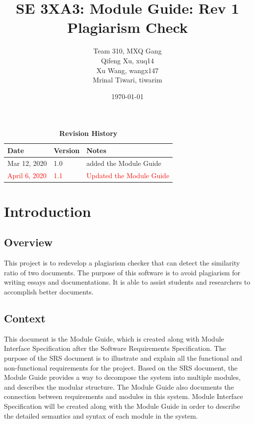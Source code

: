 \documentclass[12pt, titlepage]{article}
\title{SE 3XA3: Module Guide: Rev 1 \\Plagiarism Check}
\author{Team 310, MXQ Gang
		\\ Qifeng Xu, xuq14
		\\ Xu Wang, wangx147
		\\ Mrinal Tiwari, tiwarim
}
\date{\today}
\begin{document}
\maketitle

{
  \hypersetup{linkcolor=black}
  \tableofcontents
}
{
  \hypersetup{linkcolor=black}
  \listoftables
}

{
  \hypersetup{linkcolor=black}
  \listoffigures
}


\begin{table}[H]
\caption{\bf Revision History}
\begin{tabularx}{\textwidth}{p{3cm}p{2cm}X}
\toprule {\bf Date} & {\bf Version} & {\bf Notes}\\
\midrule
Mar 12, 2020 & 1.0 & added the Module Guide\\
\midrule
\textcolor{red}{April 6, 2020} & \textcolor{red}{1.1}& \textcolor{red}{Updated the Module Guide}\\
\bottomrule
\end{tabularx}
\end{table}

\newpage


\section{Introduction}

\subsection{Overview}

This project is to redevelop a plagiarism checker that can detect the similarity ratio of two documents. The  purpose  of  this  software  is  to  avoid  plagiarism  for  writing  essays  and documentations.  It is able to assist students and researchers to accomplish better documents.

\subsection{Context}

This document is the Module Guide, which is created along with Module Interface Specification after the Software Requirements Specification. The purpose of the SRS document is to illustrate and explain all the functional and non-functional requirements for
the project. Based on the SRS document, the Module Guide provides a way to decompose the system into multiple modules, and describes
the modular structure. The Module Guide also documents the connection between requirements and modules in this system. Module Interface Specification will be created along with the Module Guide in order to describe the detailed semantics and syntax of each module in the system.
\end{document}
